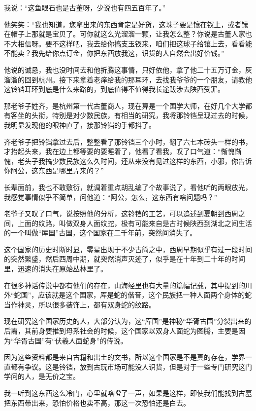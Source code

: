 我说：“这鱼眼石也是古董呀，少说也有四五百年了。”

他笑笑：“我也知道，您拿出来的东西肯定是好货，这珠子要是镶在钗上，或者镶在帽子上那就是宝贝了。可你就这么光溜溜一颗，让我怎么整？你说是古董人家也不大相信呀。要不这样吧，我去给你搞支玉钗来，咱们把这球子给镶上去，看看能不能卖？我先给你点订金，你把东西放我这，识货的人自然会出好价钱。”

他说的诚恳，我也没时间去和他折腾这事情，只好依他，拿了他二十五万订金，灰溜溜的回到杭州。接下来拿着老痒给我的那耳环，去找我爷爷的一个朋友，请教他这铃铛耳环到底是什么来路的，到底值得不值得我长途跋涉去陕西受罪。

那老爷子姓齐，是杭州第一代古董商人，现在算是一个国学大师，在好几个大学都有客坐的头衔，特别是对少数民族，有相当的研究，我将那铃铛呈现过去的时候，我明显发现他的眼神直了，接那铃铛的手都抖了。

齐老爷子把铃铛拿过去后，整整看了那铃铛三个小时，翻了六七本砖头一样的书，才抬起头来，我在边上都等要的要睡着了，他看了看我，叹了口气道：“惭愧惭愧，老头子我搞少数民族这么久时间，还从来没有见过这样的东西，小邪，你告诉你阿公，这东西是哪里弄来的？”

长辈面前，我也不敢敷衍，就调着重点胡乱编了个故事说了，看他听的两眼放光，我感觉事情似乎不简单，问他道：“阿公，怎么，这东西有啥问题吗？”

老爷子又叹了口气，说按照他的分析，这铃铛的工艺，可以追述到夏朝到西周之间，上面的纹路，叫做双身人面纹蛇，极有可能来自是古时候陕西到湖北之间生活的一个叫做“厍国”古国，这个国家在二千年前，突然间消失了。

这个国家的历史时断时显，零星出现于不少古简之中，西周早期似乎有过一段时间的突然繁盛，然后西周中期，就突然消声灭迹了，似乎是在十年到二十年的时间里，迅速的消失在原始丛林里了。

在很多神话传说中都有他们的存在，山海经里也有大量的篇幅记载，其中提到的川外“蛇国”，应该就是这个国家，厍是蛇的偕音，这个民族把一种人面两个身体的蛇当作神灵，所以很多装饰上，都有双身蛇的纹路。

现在研究这个国家历史的人，大部分认为，这“厍国”是神秘“华胥古国”分裂出来的后裔，其前身要推到母系社会的时候，这个国家以双身人面蛇为图腾，主要是因为“华胥古国”有“伏羲人面蛇身”的传说。

因为这些资料都是来自古籍和出土的文书，所以这个国家是不是真的存在，学界一直都有争议。这是铃铛，放到古玩市场可能没人识货，但是对于一些专门研究这门学问的人，是无价之宝。

我一听到这东西这么冷门，心里就咯噔了一声，如果是这样，即使我们能找到古墓把东西带出来，恐怕价格也卖不高，那这一次恐怕还是白去。

